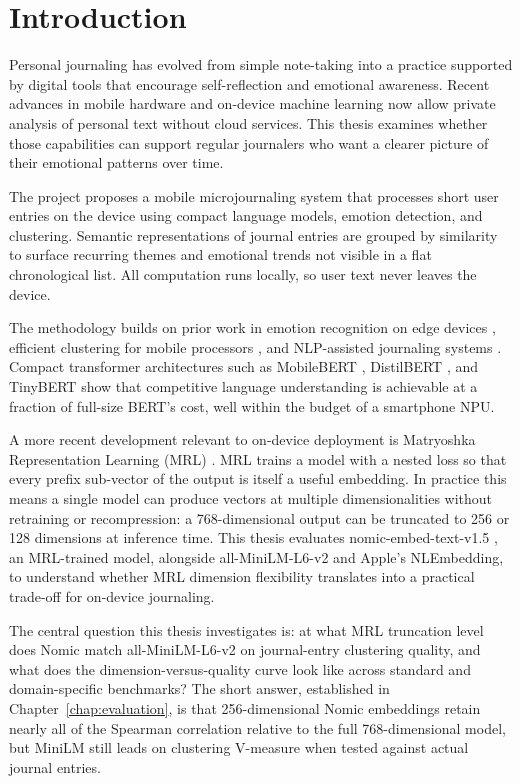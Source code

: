 \chapter{Introduction}
\label{ch:introduction}

Personal journaling has evolved from simple note-taking into a practice supported by digital tools that encourage self-reflection and emotional awareness. Recent advances in mobile hardware and on-device machine learning now allow private analysis of personal text without cloud services. This thesis examines whether those capabilities can support regular journalers who want a clearer picture of their emotional patterns over time.

The project proposes a mobile microjournaling system that processes short user entries on the device using compact language models, emotion detection, and clustering. Semantic representations of journal entries are grouped by similarity to surface recurring themes and emotional trends not visible in a flat chronological list. All computation runs locally, so user text never leaves the device.

The methodology builds on prior work in emotion recognition on edge devices \cite{Pandelea2021EmotionEdge}, efficient clustering for mobile processors \cite{awad2022improved}, and NLP-assisted journaling systems \cite{10351450}. Compact transformer architectures such as MobileBERT \cite{sun2020mobilebert}, DistilBERT \cite{sanh2019distilbert}, and TinyBERT \cite{jiao2020tinybert} show that competitive language understanding is achievable at a fraction of full-size BERT's cost, well within the budget of a smartphone NPU.

A more recent development relevant to on-device deployment is Matryoshka Representation Learning (MRL) \cite{kusupati2022matryoshka}. MRL trains a model with a nested loss so that every prefix sub-vector of the output is itself a useful embedding. In practice this means a single model can produce vectors at multiple dimensionalities without retraining or recompression: a 768-dimensional output can be truncated to 256 or 128 dimensions at inference time. This thesis evaluates nomic-embed-text-v1.5 \cite{nussbaum2024nomic}, an MRL-trained model, alongside all-MiniLM-L6-v2 \cite{reimers2019sentencebert} and Apple's NLEmbedding, to understand whether MRL dimension flexibility translates into a practical trade-off for on-device journaling.

The central question this thesis investigates is: at what MRL truncation level does Nomic match all-MiniLM-L6-v2 on journal-entry clustering quality, and what does the dimension-versus-quality curve look like across standard and domain-specific benchmarks? The short answer, established in Chapter~\ref{chap:evaluation}, is that 256-dimensional Nomic embeddings retain nearly all of the Spearman correlation relative to the full 768-dimensional model, but MiniLM still leads on clustering V-measure when tested against actual journal entries.

